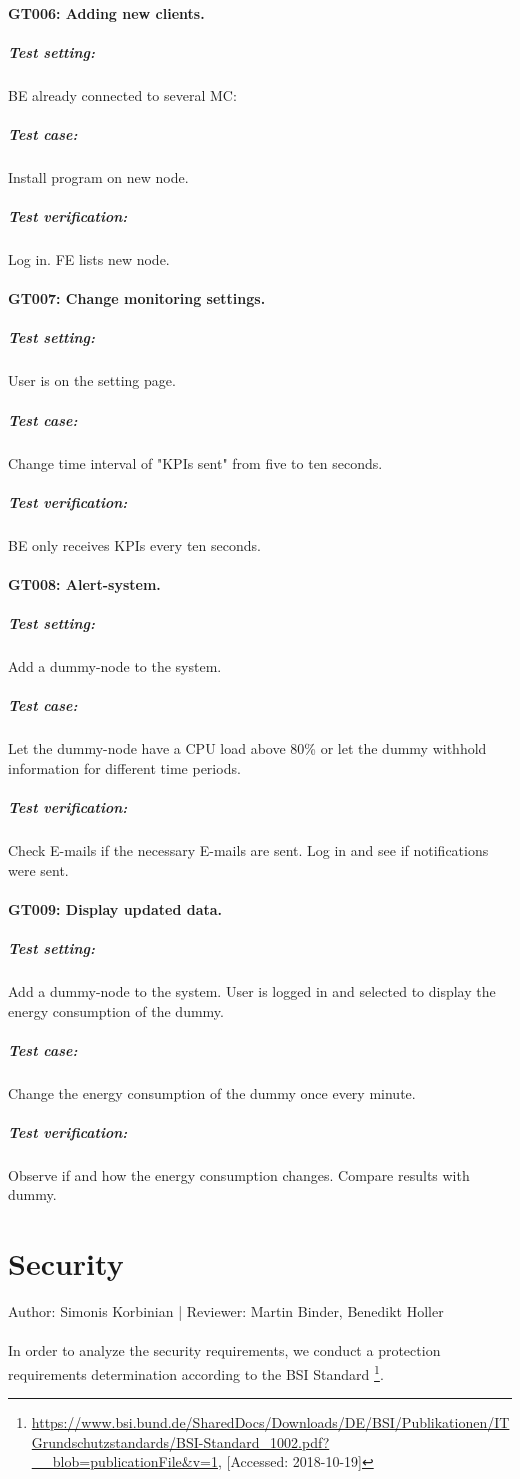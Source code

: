 \documentclass{scrreprt}
\begin{document}
\paragraph{GT006: Adding new clients.} 
\subparagraph{Test setting:} BE already connected to several MC:
\subparagraph{Test case:} Install program on new node.
\subparagraph{Test verification:} Log in. FE lists new node.

\paragraph{GT007: Change monitoring settings.} 
\subparagraph{Test setting:} User is on the setting page.
\subparagraph{Test case:} Change time interval of "KPIs sent" from five to ten seconds.
\subparagraph{Test verification:} BE only receives KPIs every ten seconds.

\paragraph{GT008: Alert-system.} 
\subparagraph{Test setting:} Add a dummy-node to the system.
\subparagraph{Test case:} Let the dummy-node have a CPU load above 80\% or let the dummy withhold information for different time periods.
\subparagraph{Test verification:} Check E-mails if the necessary E-mails are sent. Log in and see if notifications were sent.

\paragraph{GT009: Display updated data.}
\subparagraph{Test setting:} Add a dummy-node to the system. User is logged in and selected to display the energy consumption of the dummy.
\subparagraph{Test case:} Change the energy consumption of the dummy once every minute.
\subparagraph{Test verification:} Observe if and how the energy consumption changes. Compare results with dummy.
\newpage
\section{Security} 
Author: Simonis Korbinian |
Reviewer: Martin Binder, Benedikt Holler \\ \\ 
In order to analyze the security requirements, we conduct a protection requirements determination according to the BSI Standard \footnote{ \url{https://www.bsi.bund.de/SharedDocs/Downloads/DE/BSI/Publikationen/ITGrundschutzstandards/BSI-Standard\_1002.pdf?\_\_blob=publicationFile\&v=1}, [Accessed: 2018-10-19]}.
\end{document}
